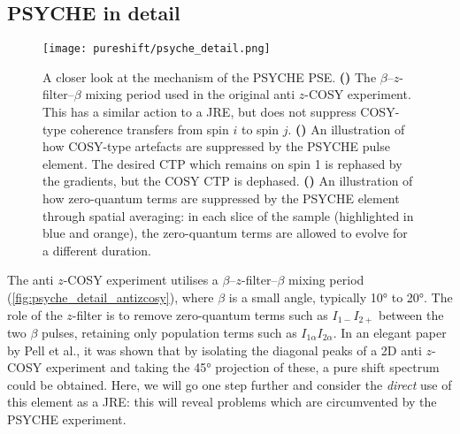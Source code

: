 \subsection{PSYCHE in detail}
\label{subsec:pureshift__psyche_analysis}

\begin{figure}[ht]
    \centering
    \texttt{[image: pureshift/psyche\_detail.png]}
    {\label{fig:psyche_detail_antizcosy}}
    {\label{fig:psyche_detail_cosy_suppress}}
    {\label{fig:psyche_detail_zqc_suppress}}
    \caption[Detailed analysis of anti $z$-COSY and PSYCHE]{
        A closer look at the mechanism of the PSYCHE PSE.
        \textbf{()} The $\beta$--$z$-filter--$\beta$ mixing period used in the original anti $z$-COSY experiment. This has a similar action to a JRE, but does not suppress COSY-type coherence transfers from spin $i$ to spin $j$.
        \textbf{()} An illustration of how COSY-type artefacts are suppressed by the PSYCHE pulse element. The desired CTP which remains on spin 1 is rephased by the gradients, but the COSY CTP is dephased.
        \textbf{()} An illustration of how zero-quantum terms are suppressed by the PSYCHE element through spatial averaging: in each slice of the sample (highlighted in blue and orange), the zero-quantum terms are allowed to evolve for a different duration.
    }
    \label{fig:psyche_detail}
\end{figure}

The anti $z$-COSY experiment utilises a $\beta$--$z$-filter--$\beta$ mixing period (\cref{fig:psyche_detail_antizcosy}), where $\beta$ is a small angle, typically \ang{10} to \ang{20}.
The role of the $z$-filter\autocite{Thrippleton2003ACIE} is to remove zero-quantum terms such as $I_{1-}I_{2+}$ between the two $\beta$ pulses, retaining only population terms such as $I_{1\alpha}I_{2\alpha}$.
In an elegant paper by Pell et al.,\autocite{Pell2007MRC} it was shown that by isolating the diagonal peaks of a 2D anti $z$-COSY experiment and taking the \ang{45} projection of these, a pure shift spectrum could be obtained.
Here, we will go one step further and consider the \textit{direct} use of this element as a JRE: this will reveal problems which are circumvented by the PSYCHE experiment.

